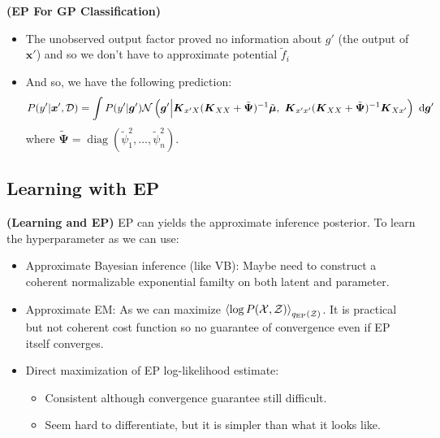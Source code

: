 \begin{remark}{\textbf{(EP For GP Classification)}}
\begin{itemize}
        \item The unobserved output factor proved no information about $g'$ (the output of $\boldsymbol x'$) and so we don't have to approximate potential $\tilde{f}_i$
        \item And so, we have the following prediction:
        \begin{equation*}
            P(y' | \boldsymbol x', \mathcal{D}) = \int P(y' | \boldsymbol g')\mathcal{N}\left(  \boldsymbol g' \Big|  \boldsymbol K_{x'X}(\boldsymbol K_{XX} + \tilde{\boldsymbol \Psi})^{-1} \tilde{\boldsymbol \mu}, \ \boldsymbol K_{x'x'}(\boldsymbol K_{XX} + \tilde{\boldsymbol \Psi})^{-1}\boldsymbol K_{Xx'}  \right) \ \mathrm{d} \boldsymbol g'
        \end{equation*}
        where $\tilde{\boldsymbol \Psi} = \operatorname{diag}(\tilde{\psi}^2_1,\dots,\tilde{\psi}^2_n)$. 
    \end{itemize}
\end{remark}

\subsection{Learning with EP}

\begin{remark}{\textbf{(Learning and EP)}}
    EP can yields the approximate inference posterior. To learn the hyperparameter as we can use:
    \begin{itemize}
        \item Approximate Bayesian inference (like VB): Maybe need to construct a coherent normalizable exponential familty on both latent and parameter. 
        \item Approximate EM: As we can maximize $\left\langle \log P(\mathcal{X}, \mathcal{Z}) \right\rangle_{q_\text{EP}(\mathcal{Z})}$. It is practical but not coherent cost function so no guarantee of convergence even if EP itself converges. 
        \item Direct maximization of EP log-likelihood estimate:
        \begin{itemize}
            \item Consistent although convergence guarantee still difficult. 
            \item Seem hard to differentiate, but it is simpler than what it looks like.
        \end{itemize}
    \end{itemize}
\end{remark}

